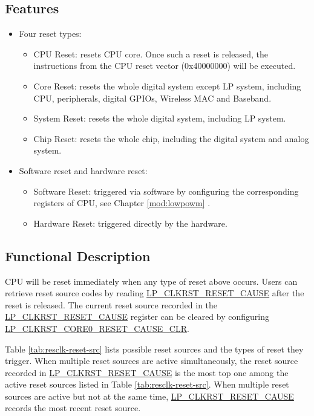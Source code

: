 \documentclass[main\_\_EN.tex]{subfiles}
\begin{document}
\subsection{Features}
\label{sec:resclk-features}
\begin{itemize}
    \item Four reset types:
    \begin{itemize}
    \item CPU Reset: resets CPU core. Once such a reset is released, the instructions from the CPU reset vector (0x40000000)  will be executed.
    \item Core Reset: resets the whole digital system except LP system, including CPU, peripherals, digital GPIOs, Wireless MAC and Baseband.
    \item System Reset: resets the whole digital system, including LP system.
    \item Chip Reset: resets the whole chip, including the digital system and analog system.
    \end{itemize}
    \item Software reset and hardware reset:
    \begin{itemize}
        \item Software Reset: triggered via software by configuring the corresponding registers of CPU, see Chapter \ref{mod:lowpowm} \textit{}.
        \item Hardware Reset: triggered directly by the hardware.
    \end{itemize}
\end{itemize}

\subsection{Functional Description}
CPU will be reset immediately when any type of reset above occurs. Users can retrieve reset source codes by reading \hyperref[fielddesc:LPCLKRSTRESETCAUSE]{LP\_CLKRST\_RESET\_CAUSE} after the reset is released. The current reset source recorded in the \hyperref[fielddesc:LPCLKRSTRESETCAUSE]{LP\_CLKRST\_RESET\_CAUSE} register can be cleared by configuring \hyperref[fielddesc:LPCLKRSTCORE0RESETCAUSECLR]{LP\_CLKRST\_CORE0\_RESET\_CAUSE\_CLR}.

Table \ref{tab:resclk-reset-src} lists possible reset sources and the types of reset they trigger. When multiple reset sources are active simultaneously, the reset source recorded in \hyperref[fielddesc:LPCLKRSTRESETCAUSE]{LP\_CLKRST\_RESET\_CAUSE} is the most top one among the active reset sources listed in Table \ref{tab:resclk-reset-src}. When multiple reset sources are active but not at the same time, \hyperref[fielddesc:LPCLKRSTRESETCAUSE]{LP\_CLKRST\_RESET\_CAUSE} records the most recent reset source.
\end{document}
